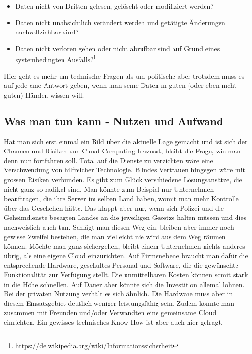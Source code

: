 \begin{itemize}
\item Daten nicht von Dritten gelesen, gelöscht oder modifiziert werden?
\item Daten nicht unabsichtlich verändert werden und getätigte Änderungen nachvollziehbar sind?
\item Daten nicht verloren gehen oder nicht abrufbar sind auf Grund eines systembedingten Ausfalls?\footnote{\url{https://de.wikipedia.org/wiki/Informationssicherheit}}
\end{itemize}

Hier geht es mehr um technische Fragen als um politische aber trotzdem muss es auf jede eine Antwort geben, wenn man seine Daten in guten (oder eben nicht guten) Händen wissen will.

\subsection{Was man tun kann - Nutzen und Aufwand}
Hat man sich erst einmal ein Bild über die aktuelle Lage gemacht und ist sich der Chancen und Risiken von Cloud-Computing bewusst, bleibt die Frage, wie man denn nun fortfahren soll. Total auf die Dienste zu verzichten wäre eine Verschwendung von hilfreicher Technologie. Blindes Vertrauen hingegen wäre mit grossen Risiken verbunden. Es gibt zum Glück verschiedene Lösungsansätze, die nicht ganz so radikal sind. Man könnte zum Beispiel nur Unternehmen beauftragen, die ihre Server im selben Land haben, womit man mehr Kontrolle über das Geschehen hätte. Das klappt aber nur, wenn sich Polizei und die Geheimdienste besagten Landes an die jeweiligen Gesetze halten müssen und dies nachweislich auch tun. Schlägt man diesen Weg ein, bleiben aber immer noch gewisse Zweifel bestehen, die man vielleicht nie wird aus dem Weg räumen können. Möchte man ganz sichergehen, bleibt einem Unternehmen nichts anderes übrig, als eine eigene Cloud einzurichten. Auf Firmenebene braucht man dafür die entsprechende Hardware, geschultes Personal und  Software, die die gewünschte Funktionalität zur Verfügung stellt. Die unmittelbaren Kosten können somit stark in die Höhe schnellen. Auf Dauer aber könnte sich die Investition allemal lohnen. Bei der privaten Nutzung verhält es sich ähnlich. Die Hardware muss aber in diesem Einsatzgebiet deutlich weniger leistungsfähig sein. Zudem könnte man zusammen mit Freunden und/oder Verwandten eine gemeinsame Cloud einrichten. Ein gewisses technisches Know-How ist aber auch hier gefragt.

